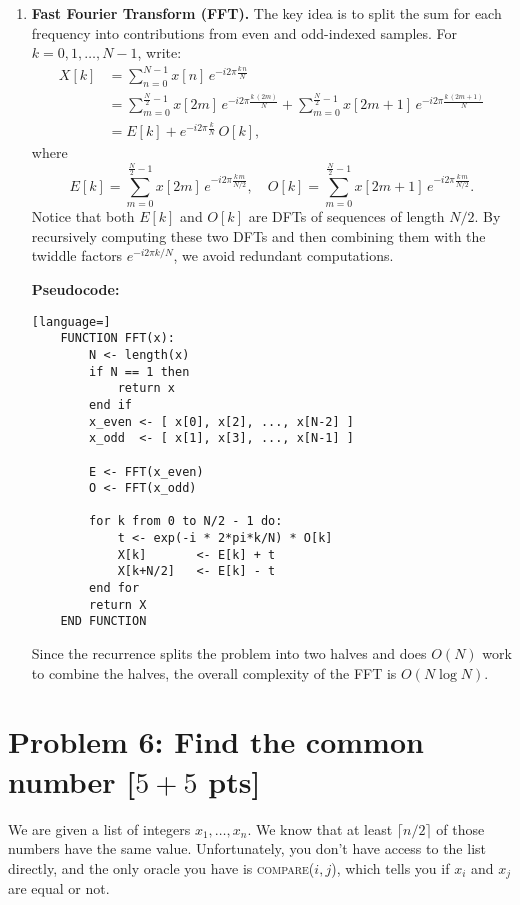 \documentclass[letterpaper, 11pt]{article}
\newcommand{\1}{\mathds{1}}	%
\theoremstyle{definition}
\newcommand{\problem}[1]{\section*{Problem #1}}
\newenvironment{solution}{{\par\noindent\it Solution.}}{}
\begin{document}
\begin{solution}
\begin{enumerate}[label=\arabic*.]
        \item \textbf{Fast Fourier Transform (FFT).}  
        The key idea is to split the sum for each frequency into contributions from even and odd-indexed samples. For $k = 0,1,\ldots,N-1$, write:
        \[
        \begin{split}
        X[k] &= \sum_{n=0}^{N-1} x[n]\, e^{-i2\pi \frac{k\,n}{N}} \\
             &= \sum_{m=0}^{\frac{N}{2}-1} x[2m]\, e^{-i2\pi \frac{k\, (2m)}{N}}
             + \sum_{m=0}^{\frac{N}{2}-1} x[2m+1]\, e^{-i2\pi \frac{k\,(2m+1)}{N}} \\
             &= E[k] + e^{-i2\pi \frac{k}{N}}\, O[k],
        \end{split}
        \]
        where
        \[
        E[k] = \sum_{m=0}^{\frac{N}{2}-1} x[2m]\, e^{-i2\pi \frac{k\, m}{N/2}},\quad
        O[k] = \sum_{m=0}^{\frac{N}{2}-1} x[2m+1]\, e^{-i2\pi \frac{k\, m}{N/2}}.
        \]
        Notice that both $E[k]$ and $O[k]$ are DFTs of sequences of length $N/2$. By recursively computing these two DFTs and then combining them with the twiddle factors $e^{-i2\pi k/N}$, we avoid redundant computations.  
    
        \medskip
        \textbf{Pseudocode:}
        \begin{lstlisting}[language=]
    FUNCTION FFT(x):
        N <- length(x)
        if N == 1 then
            return x
        end if
        x_even <- [ x[0], x[2], ..., x[N-2] ]
        x_odd  <- [ x[1], x[3], ..., x[N-1] ]

        E <- FFT(x_even)
        O <- FFT(x_odd)

        for k from 0 to N/2 - 1 do:
            t <- exp(-i * 2*pi*k/N) * O[k]
            X[k]       <- E[k] + t
            X[k+N/2]   <- E[k] - t
        end for
        return X
    END FUNCTION
        \end{lstlisting}
        
        Since the recurrence splits the problem into two halves and does $O(N)$ work to combine the halves, the overall complexity of the FFT is $O(N\log N)$.
    \end{enumerate}
\end{solution}
\newpage


\problem{6: Find the common number [$5+5$ pts]}
We are given a list of integers $x_1, \ldots, x_n$. We know that at least $\lceil n/2 \rceil$ of those numbers have the same value. Unfortunately, you don't have access to the list directly, and the only oracle you have is \textsc{compare($i,j$)}, which tells you if $x_i$ and $x_j$ are equal or not.
\end{document}
